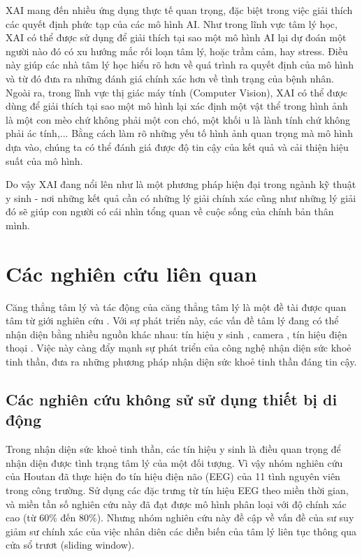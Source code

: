 XAI mang đến nhiều ứng dụng thực tế quan trọng, đặc biệt trong việc giải thích các quyết định phức tạp của các mô hình AI. Như trong lĩnh vực tâm lý học, XAI có thể được sử dụng để giải thích tại sao một mô hình AI lại dự đoán một người nào đó có xu hướng mắc rối loạn tâm lý, hoặc trầm cảm, hay stress. Điều này giúp các nhà tâm lý học hiểu rõ hơn về quá trình ra quyết định của mô hình và từ đó đưa ra những đánh giá chính xác hơn về tình trạng của bệnh nhân. Ngoài ra, trong lĩnh vực thị giác máy tính (Computer Vision), XAI có thể được dùng để giải thích tại sao một mô hình lại xác định một vật thể trong hình ảnh là một con mèo chứ không phải một con chó, một khối u là lành tính chứ không phải ác tính,... Bằng cách làm rõ những yếu tố hình ảnh quan trọng mà mô hình dựa vào, chúng ta có thể đánh giá được độ tin cậy của kết quả và cải thiện hiệu suất của mô hình.

Do vậy XAI đang nổi lên như là một phương pháp hiện đại trong ngành kỹ thuật y sinh - nơi những kết quả cần có những lý giải chính xác cũng như những lý giải đó sẽ giúp con người có cái nhìn tổng quan về cuộc sống của chính bản thân mình.



\section{Các nghiên cứu liên quan}
Căng thẳng tâm lý và tác động của căng thẳng tâm lý là một đề tài được quan tâm từ giới nghiên cứu  \cite{stress_heartrate,Stress_thermo,stress_eeg,student_life,student_life2,student_life3,student_life4,eustress_distress,eustress_distress2,eustress_distress3,eustress_distress4}. Với sự phát triển này, các vấn đề tâm lý đang có thể nhận diện bằng nhiều nguồn khác nhau: tín hiệu y sinh \cite{stress_eeg,stress_eeg2, stress_heartrate}, camera \cite{Stress_thermo}, tín hiệu điện thoại \cite{student_life, student_life2}. Việc này càng đẩy mạnh sự phát triển của công nghệ nhận diện sức khoẻ tinh thần, đưa ra những phương pháp nhận diện sức khoẻ tinh thần đáng tin cậy.
\subsection{Các nghiên cứu không sử sử dụng thiết bị di động}
Trong nhận diện sức khoẻ tinh thần, các tín hiệu y sinh là điều quan trọng để nhận diện được tình trạng tâm  lý của một đối tượng. Vì vậy nhóm nghiên cứu của Houtan \cite{stress_eeg} đã thực hiện đo tín hiệu điện não (EEG) của 11 tình nguyên viên trong công trường. Sử dụng các đặc trưng từ tín hiệu EEG theo miền thời gian, và miền tần số nghiên cứu này đã đạt được mô hình phân loại với độ chính xác cao (từ 60\% đến 80\%). Nhưng nhóm nghiên cứu này đề cập về vấn đề của sư suy giảm sư chính xác của việc nhân diên các diễn biến của tâm lý liên tục thông qua cửa sổ trươt (sliding window).

